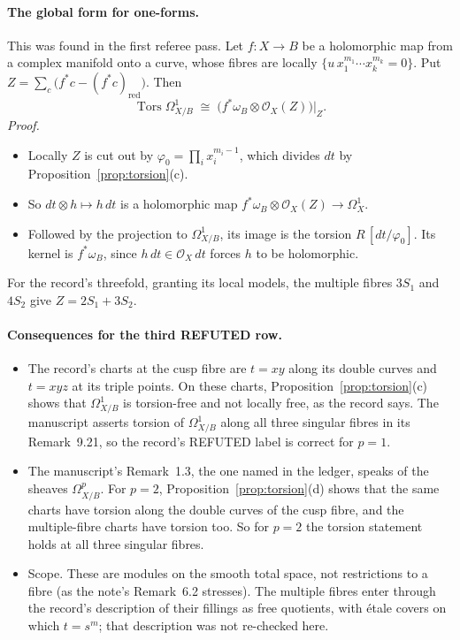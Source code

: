 \paragraph{The global form for one-forms.} This was found in the first referee pass. Let $f:X\to B$ be a holomorphic map from a complex manifold onto a curve, whose fibres are locally $\{u\,x_1^{m_1}\cdots x_k^{m_k}=0\}$. Put $Z=\sum_c\bigl(f^*c-(f^*c)_{\mathrm{red}}\bigr)$. Then
\[
\operatorname{Tors}\Omega^1_{X/B}\;\cong\;\bigl(f^*\omega_B\otimes\mathcal O_X(Z)\bigr)\big|_Z .
\]
\emph{Proof.}
\begin{itemize}
\item Locally $Z$ is cut out by $\varphi_0=\prod_ix_i^{m_i-1}$, which divides $dt$ by Proposition~\ref{prop:torsion}(c).
\item So $dt\otimes h\mapsto h\,dt$ is a holomorphic map $f^*\omega_B\otimes\mathcal O_X(Z)\to\Omega^1_X$.
\item Followed by the projection to $\Omega^1_{X/B}$, its image is the torsion $R\,[dt/\varphi_0]$. Its kernel is $f^*\omega_B$, since $h\,dt\in\mathcal O_X\,dt$ forces $h$ to be holomorphic.
\end{itemize}
For the record's threefold, granting its local models, the multiple fibres $3S_1$ and $4S_2$ give $Z=2S_1+3S_2$.

\paragraph{Consequences for the third \textsf{REFUTED} row.}
\begin{itemize}
\item The record's charts at the cusp fibre are $t=xy$ along its double curves and $t=xyz$ at its triple points. On these charts, Proposition~\ref{prop:torsion}(c) shows that $\Omega^1_{X/B}$ is torsion-free and not locally free, as the record says. The manuscript asserts torsion of $\Omega^1_{X/B}$ along all three singular fibres in its Remark~9.21, so the record's \textsf{REFUTED} label is correct for $p=1$.
\item The manuscript's Remark~1.3, the one named in the ledger, speaks of the sheaves $\Omega^p_{X/B}$. For $p=2$, Proposition~\ref{prop:torsion}(d) shows that the same charts have torsion along the double curves of the cusp fibre, and the multiple-fibre charts have torsion too. So for $p=2$ the torsion statement holds at all three singular fibres.
\item Scope. These are modules on the smooth total space, not restrictions to a fibre (as the note's Remark~6.2 stresses). The multiple fibres enter through the record's description of their fillings as free quotients, with étale covers on which $t=s^m$; that description was not re-checked here.
\end{itemize}


